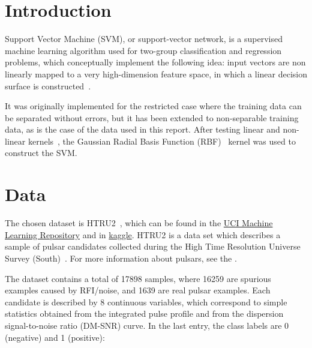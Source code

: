 \graphicspath{{./../script/pulsar-stars/}}

\section{Introduction}
Support Vector Machine (SVM), or support-vector network, is a supervised machine
learning algorithm used for two-group classification and regression problems,
which conceptually implement the following idea: input vectors are non
linearly mapped to a very high-dimension feature space, in which a linear
decision surface is constructed~\cite{cortes1995supportvector}.

It was originally implemented for the restricted case where the training data
can be separated without errors, but it has been extended to non-separable
training data, as is the case of the data used in this report.
After testing linear and non-linear 
kernels~\cite{boser1992training, aizerman2019theoretical}, the Gaussian Radial
Basis Function (RBF)~\cite{fornberg2011stable} kernel was used to construct the
SVM.

\section{Data}
The chosen dataset is HTRU2~\cite{misc_htru2_372},
which can be found in the
\href{https://archive.ics.uci.edu/dataset/372/htru2}{UCI Machine Learning Repository}
and in
\href{https://www.kaggle.com/datasets/charitarth/pulsar-dataset-htru2}{kaggle}.
HTRU2 is a data set which describes a sample of pulsar candidates collected
during the High Time Resolution Universe Survey (South)~\cite{2016MNRAS.459.1104L}.
For more information about pulsars, see the .

The dataset contains a total of 17898 samples, where 16259 are spurious examples
caused by RFI/noise, and 1639 are real pulsar examples.
Each candidate is described by 8 continuous variables, which correspond to
simple statistics obtained from the integrated pulse profile and from the 
dispersion signal-to-noise ratio (DM-SNR) curve.
In the last entry, the class labels are 0 (negative) and 1 (positive):

